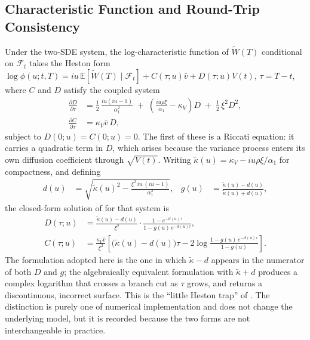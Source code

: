 \documentclass[11pt, a4paper, twoside]{article}
\begin{document}
\subsection{Characteristic Function and Round-Trip Consistency}
\label{sec:phase5-charfn}

Under the two-SDE system, the log-characteristic function of $\widetilde W(T)$ conditional on $\mathcal F_t$ takes the Heston \citeyearpar{Heston1993} form $\log\phi(u;t,T) = iu\,\mathbb E[\widetilde W(T)\mid\mathcal F_t] + C(\tau;u)\bar v + D(\tau;u) V(t)$, $\tau = T-t$, where $C$ and $D$ satisfy the coupled system
\begin{align}
\frac{\partial D}{\partial \tau} &= \frac{1}{2}\,\frac{iu(iu-1)}{\alpha_1^2} \;+\; \left(\frac{iu\rho\xi}{\alpha_1} - \kappa_V\right) D \;+\; \frac{1}{2}\,\xi^2 D^2, \\
\frac{\partial C}{\partial \tau} &= \kappa_V \bar v\, D,
\end{align}
subject to $D(0;u) = C(0;u) = 0$. The first of these is a Riccati equation: it carries a quadratic term in $D$, which arises because the variance process enters its own diffusion coefficient through $\sqrt{V(t)}$. Writing $\tilde\kappa(u) = \kappa_V - iu\rho\xi/\alpha_1$ for compactness, and defining
\begin{align}
d(u) &= \sqrt{\tilde\kappa(u)^2 - \frac{\xi^2\, iu\,(iu-1)}{\alpha_1^2}}, &
g(u) &= \frac{\tilde\kappa(u) - d(u)}{\tilde\kappa(u) + d(u)},
\end{align}
the closed-form solution of \citet{Heston1993} for that system is
\begin{align}
D(\tau;u) &= \frac{\tilde\kappa(u) - d(u)}{\xi^2} \cdot \frac{1 - e^{-d(u)\tau}}{1 - g(u)\,e^{-d(u)\tau}}, \\
C(\tau;u) &= \frac{\kappa_V \bar v}{\xi^2}\left[\bigl(\tilde\kappa(u) - d(u)\bigr)\tau - 2\log\frac{1 - g(u)\,e^{-d(u)\tau}}{1 - g(u)}\right].
\end{align}
The formulation adopted here is the one in which $\tilde\kappa - d$ appears in the numerator of both $D$ and $g$; the algebraically equivalent formulation with $\tilde\kappa + d$ produces a complex logarithm that crosses a branch cut as $\tau$ grows, and returns a discontinuous, incorrect surface. This is the ``little Heston trap'' of \citet{AlbrecherEtAl2007}. The distinction is purely one of numerical implementation and does not change the underlying model, but it is recorded because the two forms are not interchangeable in practice.
\end{document}

